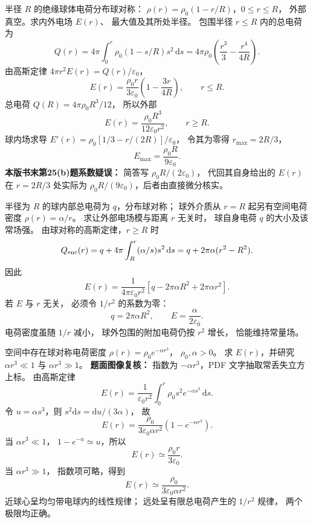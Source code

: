半径 $R$ 的绝缘球体电荷分布球对称：
$\rho(r)=\rho_0(1-r/R)$，$0\le r\le R$，
外部真空。求内外电场 $E(r)$、
最大值及其所处半径。
\exsolution
包围半径 $r\le R$ 内的总电荷为
\[
Q(r)=4\pi\int_0^r
\rho_0(1-s/R)s^2\,\mathrm ds
=4\pi\rho_0\left(\frac{r^3}3-\frac{r^4}{4R}\right).
\]
由高斯定律
$4\pi r^2E(r)=Q(r)/\varepsilon_0$，
\[
\boxed{E(r)=\frac{\rho_0r}{3\varepsilon_0}
\left(1-\frac{3r}{4R}\right)},\qquad r\le R.
\]
总电荷
$Q(R)=4\pi\rho_0R^3/12$，
所以外部
\[
\boxed{E(r)=\frac{\rho_0R^3}{12\varepsilon_0r^2}},
\qquad r\ge R.
\]
球内场求导
$E'(r)=\rho_0[1/3-r/(2R)]/\varepsilon_0$，
令其为零得
$r_{\max}=2R/3$，
\[
\boxed{E_{\max}=\frac{\rho_0R}{9\varepsilon_0}}.
\]
\excheck \textbf{本版书末第25(b)题系数疑误：}
简答写 $\rho_0R/(2\varepsilon_0)$，
代回其自身给出的 $E(r)$
在 $r=2R/3$ 处实际为
$\rho_0R/(9\varepsilon_0)$，后者由直接微分核实。

半径为 $R$ 的球内部总电荷为 $q$，分布球对称；
球外介质从 $r=R$ 起另有空间电荷密度
$\rho(r)=\alpha/r$。
求让外部电场模与距离 $r$ 无关时，
球自身电荷 $q$ 的大小及该常场强。
\exsolution
由球对称的高斯定律，$r\ge R$ 时
\[
Q_{\rm enc}(r)
=q+4\pi\int_R^r(\alpha/s)s^2\,\mathrm ds
=q+2\pi\alpha(r^2-R^2).
\]
因此
\[
E(r)=\frac1{4\pi\varepsilon_0r^2}
[q-2\pi\alpha R^2+2\pi\alpha r^2].
\]
若 $E$ 与 $r$ 无关，
必须令 $1/r^2$ 的系数为零：
\[
\boxed{q=2\pi\alpha R^2},\qquad
\boxed{E=\frac{\alpha}{2\varepsilon_0}}.
\]
\excheck 电荷密度虽随 $1/r$ 减小，
球外包围的附加电荷仍按 $r^2$ 增长，
恰能维持常量场。

空间中存在球对称电荷密度
$\rho(r)=\rho_0e^{-\alpha r^3}$，
$\rho_0,\alpha>0$。
求 $E(r)$，并研究
$\alpha r^3\ll1$ 与 $\alpha r^3\gg1$。
\exsolution
\textbf{题面图像复核：} 指数为
$-\alpha r^3$，PDF 文字抽取常丢失立方上标。
由高斯定律
\[
E(r)=\frac{1}{\varepsilon_0r^2}
\int_0^r\rho_0s^2e^{-\alpha s^3}\,\mathrm ds.
\]
令 $u=\alpha s^3$，则
$s^2\mathrm ds=\mathrm du/(3\alpha)$，
故
\[
\boxed{E(r)=\frac{\rho_0}
{3\varepsilon_0\alpha r^2}
(1-e^{-\alpha r^3})}.
\]
当 $\alpha r^3\ll1$，
$1-e^{-u}\simeq u$，所以
\[
\boxed{E(r)\simeq\frac{\rho_0r}{3\varepsilon_0}}.
\]
当 $\alpha r^3\gg1$，
指数项可略，得到
\[
\boxed{E(r)\simeq\frac{\rho_0}
{3\varepsilon_0\alpha r^2}}.
\]
\excheck 近球心呈均匀带电球内的线性规律；
远处呈有限总电荷产生的 $1/r^2$ 规律，
两个极限均正确。
